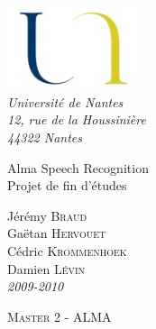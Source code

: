 \begin{titlepage}

\vspace*{2cm}



\begin{flushleft}
	\hspace{1cm} \includegraphics*[width=4cm]{images/logo.jpg}\\
	\hspace{1cm} \textsl{Université de Nantes}\\
	\hspace{1cm} \textsl{12, rue de la Houssinière}\\
	\hspace{1cm} \textit{44322 Nantes}
	\hrulefill
\end{flushleft}




\vspace{2cm}

\begin{flushright}

	{\fontsize{1.4cm}{1.65cm}\selectfont 
Alma Speech Recognition} 	 \\
	{\fontsize{0.7cm}{0.825cm}\selectfont 
Projet de fin d'études} 	 \\

	
	\vspace{1cm}
	

	
	\vspace{1cm}
	Jérémy \textsc{Braud} \\
	Gaëtan \textsc{Hervouet} \\
	Cédric \textsc{Krommenhoek} \\
	Damien \textsc{Lévin} \\
	\textit{2009-2010}
	
\end{flushright}


\vspace{2cm}

\begin{flushleft}



	\hspace{1cm} \textsc{Master 2 - ALMA}\\
	
\end{flushleft}

\hspace*{0,5cm}\hrulefill
\end{titlepage}
